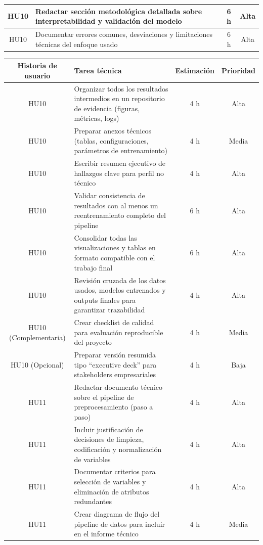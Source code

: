 \documentclass[
11pt, %
]{charter}
\begin{document}
\begin{table}[htpb]
\begin{tabularx}{\linewidth}{@{}|c|X|c|c|@{}}
HU10 & Redactar sección metodológica detallada sobre interpretabilidad y validación del modelo & 6 h & Alta \\ \hline
HU10 & Documentar errores comunes, desviaciones y limitaciones técnicas del enfoque usado & 6 h & Alta \\ \hline


\end{tabularx}
\end{table}

\begin{table}[htpb]
\centering
\begin{tabularx}{\linewidth}{@{}|c|X|c|c|@{}}
\hline
\rowcolor[HTML]{C0C0C0}
Historia de usuario & Tarea técnica & Estimación & Prioridad \\ \hline

HU10 & Organizar todos los resultados intermedios en un repositorio de evidencia (figuras, métricas, logs) & 4 h & Alta \\ \hline
HU10 & Preparar anexos técnicos (tablas, configuraciones, parámetros de entrenamiento) & 4 h & Media \\ \hline
HU10 & Escribir resumen ejecutivo de hallazgos clave para perfil no técnico & 4 h & Alta \\ \hline
HU10 & Validar consistencia de resultados con al menos un reentrenamiento completo del pipeline & 6 h & Alta \\ \hline
HU10 & Consolidar todas las visualizaciones y tablas en formato compatible con el trabajo final & 6 h & Alta \\ \hline
HU10 & Revisión cruzada de los datos usados, modelos entrenados y outputs finales para garantizar trazabilidad & 4 h & Alta \\ \hline


HU10 (Complementaria) & Crear checklist de calidad para evaluación reproducible del proyecto & 4 h & Media \\ \hline
HU10 (Opcional) & Preparar versión resumida tipo “executive deck” para stakeholders empresariales & 4 h & Baja \\ \hline

HU11 & Redactar documento técnico sobre el pipeline de preprocesamiento (paso a paso) & 4 h & Alta \\ \hline
HU11 & Incluir justificación de decisiones de limpieza, codificación y normalización de variables & 4 h & Alta \\ \hline
HU11 & Documentar criterios para selección de variables y eliminación de atributos redundantes & 4 h & Alta \\ \hline
HU11 & Crear diagrama de flujo del pipeline de datos para incluir en el informe técnico & 4 h & Media \\ \hline


\end{tabularx}
\end{table}
\end{document}
